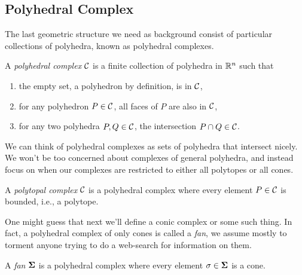 \documentclass[12pt,oneside]{../../sfsuthesis}
\begin{document}
\subsection{Polyhedral Complex}
The last geometric structure we need as background consist of particular collections of polyhedra, known as polyhedral complexes.
\begin{definition}\th\label{def:polyhedralComplex}
    A \emph{polyhedral complex} \( \mathcal{C} \) is a finite collection of polyhedra in \( \mathbb{R}^n \) such that
    \begin{enumerate}
        \item the empty set, a polyhedron by definition, is in \( \mathcal{C} \),
        \item for any polyhedron \( P \in \mathcal{C} \), all faces of \( P \) are also in \( \mathcal{C} \),
        \item for any two polyhedra \( P, Q \in \mathcal{C} \), the intersection \( P \cap Q \in \mathcal{C} \).
    \end{enumerate}
\end{definition}
We can think of polyhedral complexes as sets of polyhedra that intersect nicely.
We won't be too concerned about complexes of general polyhedra, and instead focus on when our complexes are restricted to either all polytopes or all cones.
\begin{definition}\th\label{def:polytopalComplex}
    A \emph{polytopal complex} \( \mathcal{C} \) is a polyhedral complex where every element \( P \in \mathcal{C} \) is bounded, i.e., a polytope.
\end{definition}
One might guess that next we'll define a conic complex or some such thing.
In fact, a polyhedral complex of only cones is called a \emph{fan}, we assume mostly to torment anyone trying to do a web-search for information on them.
\begin{definition}[Fan]\th\label{def:fan}
    A \emph{fan} \( \bm{\Sigma} \) is a polyhedral complex where every element \( \sigma \in \bm{\Sigma} \) is a cone.
\end{definition}
\end{document}
